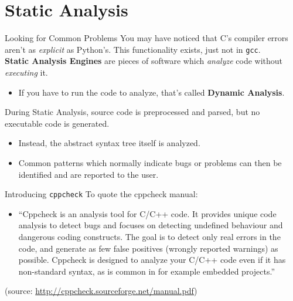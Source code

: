 \documentclass[11pt]{beamer}
\begin{document}
\section[Static Analysis]{Static Analysis}
\begin{frame}{Looking for Common Problems}
You may have noticed that C's compiler errors aren't as \emph{explicit} as Python's.  This functionality exists, just not in \texttt{gcc}. \\

\textbf{Static Analysis Engines} are pieces of software which \emph{analyze} code without \emph{executing} it.  
\begin{itemize}
\item If you have to run the code to analyze, that's called \textbf{Dynamic Analysis}.  
\end{itemize}

During Static Analysis, source code is preprocessed and parsed, but no executable code is generated.  
\begin{itemize}
\item Instead, the abstract syntax tree itself is analyzed.  
\item Common patterns which normally indicate bugs or problems can then be identified and are reported to the user.  
\end{itemize}
\end{frame}

\begin{frame}{Introducing \texttt{cppcheck}}
To quote the cppcheck manual:
\begin{itemize}
\item ``Cppcheck is an analysis tool for C/C++ code. It provides unique code analysis to detect bugs and focuses on detecting undefined behaviour and dangerous coding constructs. The goal is to detect only real errors in the code, and generate as few false positives (wrongly reported warnings) as possible. Cppcheck is designed to analyze your C/C++ code even if it has non-standard syntax, as is common in for example embedded projects.''
\end{itemize}
(source: \url{http://cppcheck.sourceforge.net/manual.pdf})
\end{frame}
\end{document}
